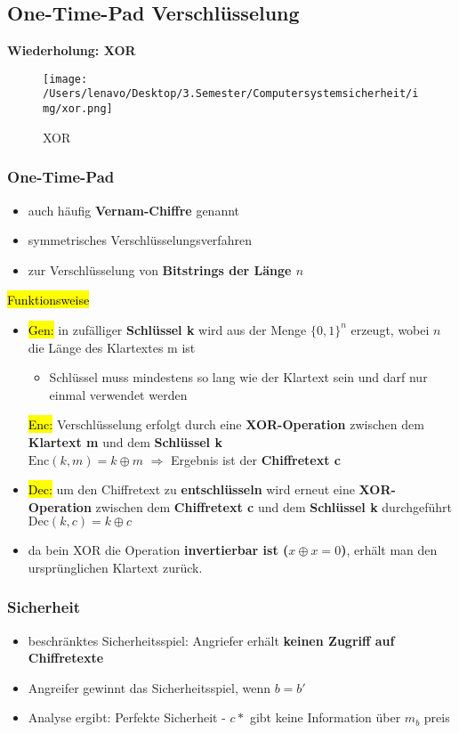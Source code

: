 \documentclass[a4paper, 10pt]{article}
\begin{document}
\subsection{One-Time-Pad Verschlüsselung}
\textbf{Wiederholung: XOR}
\begin{figure}[h]
    \centering
    \texttt{[image: /Users/lenavo/Desktop/3.Semester/Computersystemsicherheit/img/xor.png]}
    \caption{XOR}
    \label{fig:enter-label}
\end{figure}
\subsubsection{One-Time-Pad}
\begin{itemize}
    \item auch häufig \textbf{Vernam-Chiffre} genannt
    \item symmetrisches Verschlüsselungsverfahren
    \item zur Verschlüsselung von \textbf{Bitstrings der Länge $n$}
\end{itemize}
\hl{Funktionsweise}
\begin{itemize}
    \item \hl{Gen:} in zufälliger \textbf{Schlüssel k} wird aus der Menge $\{0,1\}^n$ erzeugt, wobei $n$ die Länge des Klartextes m ist
    \begin{itemize}
        \item Schlüssel muss mindestens so lang wie der Klartext sein und darf nur einmal verwendet werden
    \end{itemize}
    \hl{Enc:} Verschlüsselung erfolgt durch eine \textbf{XOR-Operation} zwischen dem \textbf{Klartext m} und dem \textbf{Schlüssel k}\\[2mm]
        $\text{Enc}(k, m) = k \oplus m$ \qquad $\Longrightarrow$ Ergebnis ist der \textbf{Chiffretext c}


    \item \hl{Dec:} um den Chiffretext zu \textbf{entschlüsseln} wird erneut eine \textbf{XOR-Operation} zwischen dem \textbf{Chiffretext c} und dem \textbf{Schlüssel k} durchgeführt\\[2mm]
        $ \text{Dec}(k, c) = k \oplus c $

    
    \item da bein XOR die Operation \textbf{invertierbar ist ($x \oplus x  = 0$)}, erhält man den ursprünglichen Klartext zurück.
\end{itemize}

\subsubsection{Sicherheit}
\begin{itemize}
    \item beschränktes Sicherheitsspiel: Angriefer erhält \textbf{keinen Zugriff auf Chiffretexte}
    \item Angreifer gewinnt das Sicherheitsspiel, wenn $b = b'$
    \item Analyse ergibt: Perfekte Sicherheit - $c*$ gibt keine Information über $m_b$ preis
\end{itemize}
\end{document}
